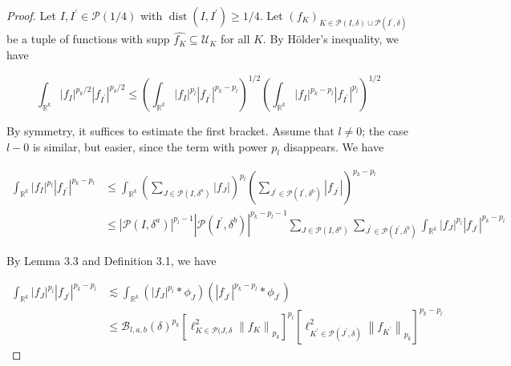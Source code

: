 \begin{proof}
    Let $I, I^{\prime} \in \mathcal{P}(1 / 4)$ with $\operatorname{dist}\left(I, I^{\prime}\right) \geqslant 1 / 4$. Let $\left(f_{K}\right)_{K \in \mathcal{P}(I, \delta) \cup \mathcal{P}\left(I^{\prime}, \delta\right)}$ be a tuple of functions with supp $\widehat{f_{K}} \subseteq \mathcal{U}_{K}$ for all $K$. By Hölder's inequality, we have


\begin{equation*}
\int_{\mathbb{R}^{k}}\left|f_{I}\right|^{p_{k} / 2}\left|f_{I^{\prime}}\right|^{p_{k} / 2} \leqslant\left(\int_{\mathbb{R}^{k}}\left|f_{I}\right|^{p_{l}}\left|f_{I^{\prime}}\right|^{p_{k}-p_{l}}\right)^{1 / 2}\left(\int_{\mathbb{R}^{k}}\left|f_{I}\right|^{p_{k}-p_{l}}\left|f_{I^{\prime}}\right|^{p_{l}}\right)^{1 / 2} \tag{3.5}
\end{equation*}


By symmetry, it suffices to estimate the first bracket. Assume that $l \neq 0$; the case $l-0$ is similar, but easier, since the term with power $p_{l}$ disappears. We have

$$
\begin{aligned}
\int_{\mathbb{R}^{k}}\left|f_{I}\right|^{p_{l}}\left|f_{I^{\prime}}\right|^{p_{k}-p_{l}} & \leqslant \int_{\mathbb{R}^{k}}\left(\sum_{J \in \mathcal{P}\left(I, \delta^{a}\right)}\left|f_{J}\right|\right)^{p_{l}}\left(\sum_{J^{\prime} \in \mathcal{P}\left(I^{\prime}, \delta^{b}\right)}\left|f_{J^{\prime}}\right|\right)^{p_{k}-p_{l}} \\
& \leqslant\left|\mathcal{P}\left(I, \delta^{a}\right)\right|^{p_{l}-1}\left|\mathcal{P}\left(I^{\prime}, \delta^{b}\right)\right|^{p_{k}-p_{l}-1} \sum_{J \in \mathcal{P}\left(I, \delta^{a}\right)} \sum_{J^{\prime} \in \mathcal{P}\left(I^{\prime}, \delta^{b}\right)} \int_{\mathbb{R}^{k}}\left|f_{J}\right|^{p_{l}}\left|f_{J^{\prime}}\right|^{p_{k}-p_{l}}
\end{aligned}
$$

By Lemma 3.3 and Definition 3.1, we have

$$
\begin{aligned}
\int_{\mathbb{R}^{k}}\left|f_{J}\right|^{p_{l}}\left|f_{J^{\prime}}\right|^{p_{k}-p_{l}} & \lesssim \int_{\mathbb{R}^{k}}\left(\left|f_{J}\right|^{p_{l}} * \phi_{J}\right)\left(\left|f_{J^{\prime}}\right|^{p_{k}-p_{l}} * \phi_{J^{\prime}}\right) \\
& \leqslant \mathcal{B}_{l, a, b}(\delta)^{p_{k}}\left[\ell_{K \in \mathcal{P}(J, \delta}^{2}\left\|f_{K}\right\|_{p_{k}}\right]^{p_{l}}\left[\ell_{K^{\prime} \in \mathcal{P}\left(J^{\prime}, \delta\right)}^{2}\left\|f_{K^{\prime}}\right\|_{p_{k}}\right]^{p_{k}-p_{l}}
\end{aligned}
$$


\end{proof}
